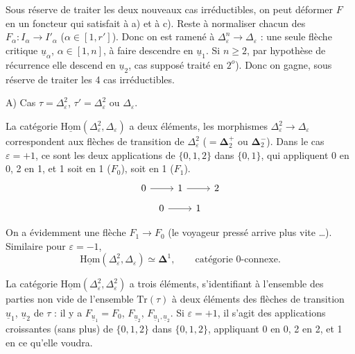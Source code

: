 \documentclass[11pt]{article}
\newcommand{\msp}[1]{\marginpar{\footnotesize [#1]}}
\newcommand{\uHom}{\underline{\mathrm{Hom}}}
\newcommand{\ul}[1]{\underline{#1}}
\begin{document}
Sous réserve de traiter les deux nouveaux cas irréductibles, on peut déformer $F$ en un foncteur qui satisfait à a) et à c). Reste à normaliser chacun des $F_\alpha:I_\alpha\longrightarrow I'_\alpha$ ($\alpha\in[1,r']$). Donc on est ramené à $\Delta^n_\varepsilon\longrightarrow\Delta_\varepsilon$ : une seule flèche critique $\ul{u}_\alpha$, $\alpha\in[1,n]$, à faire descendre en $\ul{u}_1$. Si $n\geq2$, par hypothèse de récurrence elle descend en $\ul{u}_2$, cas supposé traité en $2^o$). Donc
\msp{page 92}
on gagne, sous réserve de traiter les 4 cas irréductibles.

A) Cas $\tau=\Delta^2_\varepsilon$, $\tau'=\Delta^2_\varepsilon$ ou $\Delta_\varepsilon$.

La catégorie $\uHom(\Delta^2_\varepsilon,\Delta_\varepsilon)$ a deux éléments, les morphismes $\Delta^2_\varepsilon\longrightarrow\Delta_\varepsilon$ correspondent aux flèches de transition de $\Delta^2_\varepsilon$ ($=\mathbf{\Delta}^+_2$ ou $\mathbf{\Delta}^-_2$). Dans le cas $\varepsilon=+1$, ce sont les deux applications de $\{0,1,2\}$ dans $\{0,1\}$, qui appliquent 0 en 0, 2 en 1, et 1 soit en 1 ($F_0$), soit en 1 ($F_1$).
\[
\begin{tikzcd}
0 \arrow[r] & 1 \arrow[r] & 2
\end{tikzcd}
\]
\[
\begin{tikzcd}
0 \arrow[r] & 1
\end{tikzcd}
\]

On a évidemment une flèche $F_1\longrightarrow F_0$ (le voyageur pressé arrive plus vite \ldots). Similaire pour $\varepsilon=-1$,
\[
\uHom(\Delta^2_\varepsilon,\Delta_\varepsilon)\simeq\mathbf{\Delta}^1,\qquad\text{catégorie 0-connexe.}
\]

La catégorie $\uHom(\Delta^2_\varepsilon,\Delta^2_\varepsilon)$ a trois éléments, s'identifiant à l'ensemble des parties non vide de l'ensemble $\mathrm{Tr}(\tau)$ à deux éléments des flèches de transition $\ul{u}_1$, $\ul{u}_2$ de $\tau$ : il y a $F_{\ul{u}_1}=F_0$, $F_{\ul{u}_2}$, $F_{\ul{u}_1,\ul{u}_2}$. Si $\varepsilon=+1$, il s'agit des applications croissantes (sans plus) de $\{0,1,2\}$ dans $\{0,1,2\}$, appliquant 0 en 0, 2 en 2, et 1 en ce qu'elle voudra. %
\end{document}
